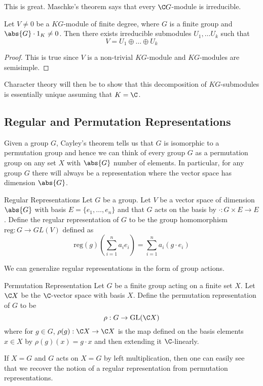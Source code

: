 \documentclass[a4paper]{article}
\begin{document}
This is great. Maschke's theorem says that every $\C G$-module is irreducible. 

\begin{crl}{}{} Let $V\neq 0$ be a $KG$-module of finite degree, where $G$ is a finite group and $\abs{G}\cdot 1_K\neq 0$. Then there exists irreducible submodules $U_1,\dots U_k$ such that $$V=U_1\oplus\dots\oplus U_k$$ \tcbline
\begin{proof}
This is true since $V$ is a non-trivial $KG$-module and $KG$-modules are semisimple. 
\end{proof}
\end{crl}

Character theory will then be to show that this decomposition of $KG$-submodules is essentially unique assuming that $K=\C$. 

\subsection{Regular and Permutation Representations}
Given a group $G$, Cayley's theorem tells us that $G$ is isomorphic to a permutation group and hence we can think of every group $G$ as a permutation group on any set $X$ with $\abs{G}$ number of elements. In particular, for any group $G$ there will always be a representation where the vector space has dimension $\abs{G}$. 

\begin{defn}{Regular Representations}{} Let $G$ be a group. Let $V$ be a vector space of dimension $\abs{G}$ with basis $E=\{e_1,\dots,e_n\}$ and that $G$ acts on the basis by $\cdot:G\times E\to E$. Define the regular representation of $G$ to be the group homomorphism $\text{reg}:G\to GL(V)$ defined as $$\text{reg}(g)\left(\sum_{i=1}^na_ie_i\right)=\sum_{i=1}^na_i(g\cdot e_i)$$
\end{defn}

We can generalize regular representations in the form of group actions. 

\begin{defn}{Permutation Representation}{} Let $G$ be a finite group acting on a finite set $X$. Let $\C X$ be the $\C$-vector space with basis $X$. Define the permutation representation of $G$ to be $$\rho:G\to\text{GL}(\C X)$$ where for $g\in G$, $\rho(g):\C X\to\C X$ is the map defined on the basis elements $x\in X$ by $\rho(g)(x)=g\cdot x$ and then extending it $\C$-linearly. 
\end{defn}

If $X=G$ and $G$ acts on $X=G$ by left multiplication, then one can easily see that we recover the notion of a regular representation from permutation representations. 
\end{document}
